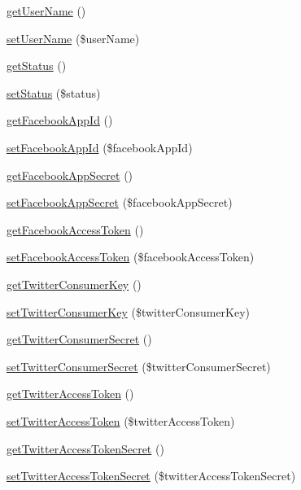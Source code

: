\begin{DoxyCompactItemize}
\item 
\hyperlink{class_social_aafd6d1ef27e6acc5833aba4012e5ee77}{get\+User\+Name} ()
\item 
\hyperlink{class_social_a20f0087f72763b84d2992ba6ffee2fb2}{set\+User\+Name} (\$user\+Name)
\item 
\hyperlink{class_social_a9d21636071f529e2154051d3ea6e5921}{get\+Status} ()
\item 
\hyperlink{class_social_a7d02c100d684fe1dffc6cb3486a48511}{set\+Status} (\$status)
\item 
\hyperlink{class_social_a2e936773e33d0531bbcd1310d7688572}{get\+Facebook\+App\+Id} ()
\item 
\hyperlink{class_social_a07a3720005ba785eaddc02aec6901f99}{set\+Facebook\+App\+Id} (\$facebook\+App\+Id)
\item 
\hyperlink{class_social_a9b77f44dfac83303cb945d3b01ef69ed}{get\+Facebook\+App\+Secret} ()
\item 
\hyperlink{class_social_ad4ffa58e70ef5e9630edbd45055fa5c2}{set\+Facebook\+App\+Secret} (\$facebook\+App\+Secret)
\item 
\hyperlink{class_social_a5888e496d216ad6d354f4ca05928b39e}{get\+Facebook\+Access\+Token} ()
\item 
\hyperlink{class_social_a3f3f9492bb8b8d90ecdb825252b3bcda}{set\+Facebook\+Access\+Token} (\$facebook\+Access\+Token)
\item 
\hyperlink{class_social_a5cce70a5a695963373052ba7da06b28f}{get\+Twitter\+Consumer\+Key} ()
\item 
\hyperlink{class_social_afe423eee7492be9f4cc54cfd25318cde}{set\+Twitter\+Consumer\+Key} (\$twitter\+Consumer\+Key)
\item 
\hyperlink{class_social_aba45da52f02cea42f83a715c89aed150}{get\+Twitter\+Consumer\+Secret} ()
\item 
\hyperlink{class_social_a062a611e082ddd47922ca6e272b705cc}{set\+Twitter\+Consumer\+Secret} (\$twitter\+Consumer\+Secret)
\item 
\hyperlink{class_social_ac847a4db6d0c98957ddcff1345b83936}{get\+Twitter\+Access\+Token} ()
\item 
\hyperlink{class_social_abc0f567d77ae4559458fd0886b8b99b8}{set\+Twitter\+Access\+Token} (\$twitter\+Access\+Token)
\item 
\hyperlink{class_social_a51138e7215edea8ad46ccf0fc4a5b8f3}{get\+Twitter\+Access\+Token\+Secret} ()
\item 
\hyperlink{class_social_ab77b0bbac3358161c665409a19207172}{set\+Twitter\+Access\+Token\+Secret} (\$twitter\+Access\+Token\+Secret)

\end{DoxyCompactItemize}
